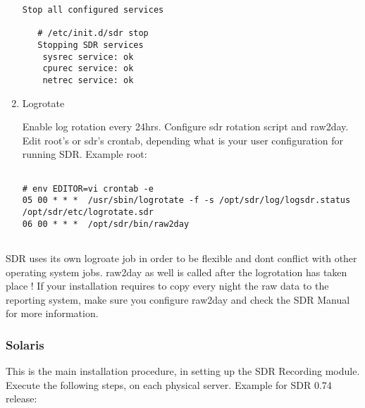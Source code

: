 \begin{enumerate}
\begin{Verbatim}[fontsize=\relsize{-2},frame=single,
                label=\fbox{Startup},
                framesep=2mm,labelposition=bottomline]
 Stop all configured services

   # /etc/init.d/sdr stop
   Stopping SDR services
    sysrec service: ok
    cpurec service: ok
    netrec service: ok

\end{Verbatim}

\item Logrotate

Enable log rotation every 24hrs. Configure sdr rotation script 
and raw2day. Edit root's or sdr's crontab, depending what
is your user configuration for running SDR. Example root:

\begin{Verbatim}[fontsize=\relsize{-2},frame=single,
                label=\fbox{Logrotate},
                framesep=2mm,labelposition=bottomline]

# env EDITOR=vi crontab -e
05 00 * * *  /usr/sbin/logrotate -f -s /opt/sdr/log/logsdr.status /opt/sdr/etc/logrotate.sdr
06 00 * * *  /opt/sdr/bin/raw2day


\end{Verbatim}
\end{enumerate}

SDR uses its own logroate job in order to be flexible and dont conflict with 
other operating system jobs. raw2day as well is called after the logrotation 
has taken place ! If your installation requires to copy every night the raw 
data to the reporting system, make sure you configure raw2day and check the 
SDR Manual for more information.    



\subsubsection*{Solaris}

This is the main installation procedure, in setting up
the SDR Recording module. Execute the following steps,
on each physical server. Example for SDR 0.74 release:

